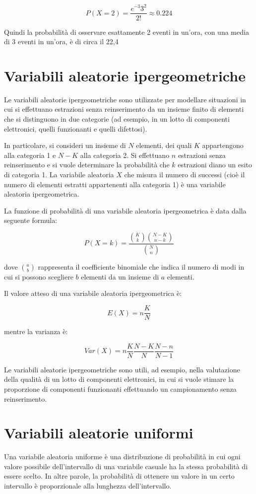 $$P(X=2) = \frac{e^{-3} 3^2}{2!} \approx 0.224$$

Quindi la probabilità di osservare esattamente 2 eventi in un'ora, con una media di 3 eventi in un'ora, è di circa il 22,4%

\section{Variabili aleatorie ipergeometriche}
Le variabili aleatorie ipergeometriche sono utilizzate per modellare situazioni in cui si effettuano estrazioni senza reinserimento da un insieme finito di elementi che si distinguono in due categorie (ad esempio, in un lotto di componenti elettronici, quelli funzionanti e quelli difettosi).

In particolare, si consideri un insieme di $N$ elementi, dei quali $K$ appartengono alla categoria 1 e $N-K$ alla categoria 2. Si effettuano $n$ estrazioni senza reinserimento e si vuole determinare la probabilità che $k$ estrazioni diano un esito di categoria 1. La variabile aleatoria $X$ che misura il numero di successi (cioè il numero di elementi estratti appartenenti alla categoria 1) è una variabile aleatoria ipergeometrica.

La funzione di probabilità di una variabile aleatoria ipergeometrica è data dalla seguente formula:

$$ P(X=k) = \frac{{K \choose k}{N-K \choose n-k}}{ {N \choose n}} $$

dove ${a \choose b}$ rappresenta il coefficiente binomiale che indica il numero di modi in cui si possono scegliere $b$ elementi da un insieme di $a$ elementi.

Il valore atteso di una variabile aleatoria ipergeometrica è:

$$ E(X) = n\frac{K}{N} $$

mentre la varianza è:

$$ Var(X) = n\frac{K}{N}\frac{N-K}{N}\frac{N-n}{N-1} $$

Le variabili aleatorie ipergeometriche sono utili, ad esempio, nella valutazione della qualità di un lotto di componenti elettronici, in cui si vuole stimare la proporzione di componenti funzionanti effettuando un campionamento senza reinserimento.

\section{Variabili aleatorie uniformi}
Una variabile aleatoria uniforme è una distribuzione di probabilità in cui ogni valore possibile dell'intervallo di una variabile casuale ha la stessa probabilità di essere scelto. In altre parole, la probabilità di ottenere un valore in un certo intervallo è proporzionale alla lunghezza dell'intervallo.

